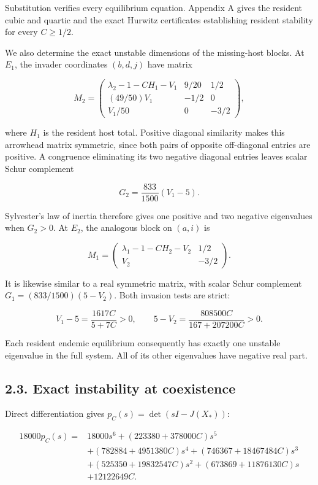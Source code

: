 \documentclass[
  11pt,
]{article}
\begin{document}
Substitution verifies every equilibrium equation. Appendix A gives the
resident cubic and quartic and the exact Hurwitz certificates
establishing resident stability for every \(C\geq1/2\).

We also determine the exact unstable dimensions of the missing-host
blocks. At \(E_1\), the invader coordinates \((b,d,j)\) have matrix

\[
M_2=
\begin{pmatrix}
\lambda_2-1-CH_1-V_1&9/20&1/2\\
(49/50)V_1&-1/2&0\\
V_1/50&0&-3/2
\end{pmatrix}, \tag{2.5}
\]

where \(H_1\) is the resident host total. Positive diagonal similarity
makes this arrowhead matrix symmetric, since both pairs of opposite
off-diagonal entries are positive. A congruence eliminating its two
negative diagonal entries leaves scalar Schur complement

\[
G_2=\frac{833}{1500}(V_1-5).
\]

Sylvester's law of inertia therefore gives one positive and two negative
eigenvalues when \(G_2>0\). At \(E_2\), the analogous block on \((a,i)\)
is

\[
M_1=\begin{pmatrix}
\lambda_1-1-CH_2-V_2&1/2\\
V_2&-3/2
\end{pmatrix}. \tag{2.6}
\]

It is likewise similar to a real symmetric matrix, with scalar Schur
complement \(G_1=(833/1500)(5-V_2)\). Both invasion tests are strict:

\[
V_1-5=\frac{1617C}{5+7C}>0,\qquad
5-V_2=\frac{808500C}{167+207200C}>0. \tag{2.7}
\]

Each resident endemic equilibrium consequently has exactly one unstable
eigenvalue in the full system. All of its other eigenvalues have
negative real part.

\subsection{2.3. Exact instability at
coexistence}\label{exact-instability-at-coexistence}

Direct differentiation gives \(p_C(s)=\det(sI-J(X_*))\):

\[
\begin{aligned}
18000p_C(s)={}&18000s^6+(223380+378000C)s^5\\
&+(782884+4951380C)s^4+(746367+18467484C)s^3\\
&+(525350+19832547C)s^2+(673869+11876130C)s\\
&+12122649C.
\end{aligned} \tag{2.8}
\]
\end{document}
